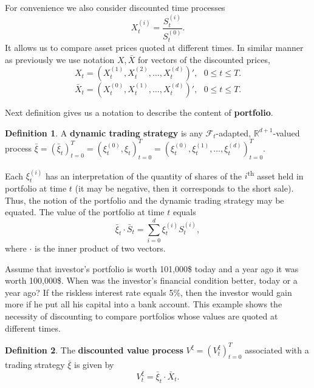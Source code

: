 \documentclass[a4paper,11pt, twoside]{book}
\theoremstyle{definition}
\newtheorem{mydef}{Definition}[chapter]
\theoremstyle{remark}
\newcounter{example}[chapter]
\def\R{{\mathbb{R}}}
\def\Sa{\bar{S}}
\def\Xa{\bar{X}}
\def\xia{\bar{\xi}}
\begin{document}
For convenience we also consider discounted time processes
\[ X^{(i)}_t = \frac{S^{(i)}_t}{S^{(0)}_t}. \]
It allows us to compare asset prices quoted at different times. In similar manner as previously we use notation $X, \Xa$ for vectors of the discounted prices,
\begin{equation*}
 X_t = (X^{(1)}_t, X^{(2)}_t, \ldots, X^{(d)}_t)', \ \ \ 0 \leq t \leq T.
\end{equation*}
\begin{equation*}
 \Xa_t = (X^{(0)}_t, X^{(1)}_t, \ldots, X^{(d)}_t)', \ \ \ 0 \leq t \leq T.
\end{equation*}

Next definition gives us a notation to describe the content of \textbf{portfolio}.
\begin{mydef}
A \textbf{dynamic trading strategy} is any $\mathcal{F}_t$-adapted,  $\R^{d+1}$-valued process $\xia = (\xia_t)_{t=0}^T = (\xi^{(0)}_t, \xi_t)_{t=0}^T = (\xi^{(0)}_t, \xi^{(1)}_t, \ldots, \xi^{(d)}_t)_{t=0}^T$.
\end{mydef}
Each $\xi^{(i)}_t$ has an interpretation of the quantity of shares of the $i$\textsuperscript{th} asset held in portfolio at time $t$ (it may be negative, then it corresponds to the short sale). Thus, the notion of the portfolio and the dynamic trading strategy may be equated. The value of the portfolio at time $t$ equals
\[\xia_t \cdot \Sa_t = \sum\limits_{i=0}^d \xi^{(i)}_t S^{(i)}_t,\]
where $\cdot$ is the inner product of two vectors.

Assume that investor's portfolio is worth 101,000\$ today and a year ago it was worth 100,000\$. When was the investor's financial condition better, today or a year ago? If the riskless interest rate equals 5\%, then the investor would gain more if he put all his capital into a bank account. This example shows the necessity of discounting to compare portfolios whose values are quoted at different times.
\begin{mydef}
 The \textbf{discounted value process} $V^{\xi} = (V^{\xi}_t)_{t=0}^T$ associated with a trading strategy $\xia$ is given by 
 \begin{equation*}
  V^{\xi}_t = \xia_t \cdot \Xa_t.
 \end{equation*}
\end{mydef}
\end{document}
